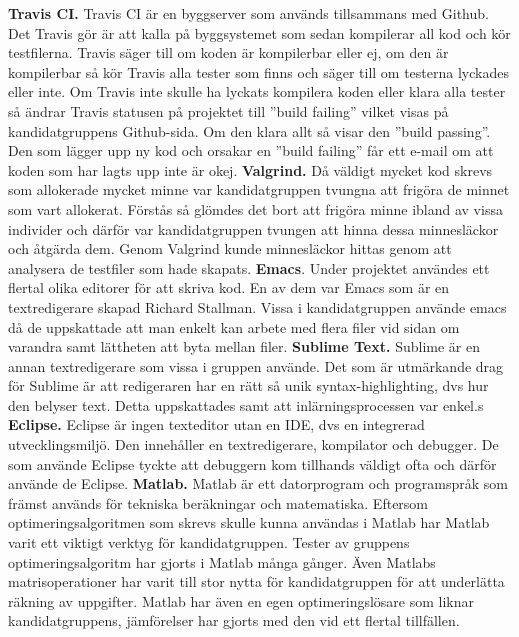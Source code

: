 \newline
\newline 
\textbf{Travis CI.} Travis CI är en byggserver som används tillsammans med Github. Det Travis gör är att kalla på byggsystemet som sedan kompilerar all kod och kör testfilerna. Travis säger till om koden är kompilerbar eller ej, om den är kompilerbar så kör Travis alla tester som finns och säger till om testerna lyckades eller inte. Om Travis inte skulle ha lyckats kompilera koden eller klara alla tester så ändrar Travis statusen på projektet till ''build failing'' vilket visas på kandidatgruppens Github-sida. Om den klara allt så visar den ''build passing''. Den som lägger upp ny kod och orsakar en ''build failing'' får ett e-mail om att koden som har lagts upp inte är okej.
\newline
\newline
\textbf{Valgrind.} Då väldigt mycket kod skrevs som allokerade mycket minne var kandidatgruppen tvungna att frigöra de minnet som vart allokerat. Förstås så glömdes det bort att frigöra minne ibland av vissa individer och därför var kandidatgruppen tvungen att hinna dessa minnesläckor och åtgärda dem. Genom Valgrind kunde minnesläckor hittas genom att analysera de testfiler som hade skapats. 
\newline
\newline
\textbf{Emacs}. Under projektet användes ett flertal olika editorer för att skriva kod. En av dem var Emacs som är en textredigerare skapad Richard 	Stallman. Vissa i kandidatgruppen använde emacs då de uppskattade att man enkelt kan arbete med flera filer vid sidan om varandra samt lättheten att byta mellan filer.
\newline
\newline
\textbf{Sublime Text.} Sublime är en annan textredigerare som vissa i gruppen använde. Det som är utmärkande drag för Sublime är att redigeraren har en rätt så unik syntax-highlighting, dvs hur den belyser text. Detta uppskattades samt att inlärningsprocessen var enkel.s
\newline
\newline
\textbf{Eclipse.} Eclipse är ingen texteditor utan en IDE, dvs en integrerad utvecklingsmiljö. Den innehåller en textredigerare, kompilator och debugger. De som använde Eclipse tyckte att debuggern kom tillhands väldigt ofta och därför använde de Eclipse.
\newline
\newline
\textbf{Matlab.} Matlab är ett datorprogram och programspråk som främst används för tekniska beräkningar och matematiska. Eftersom optimeringsalgoritmen som skrevs skulle kunna användas i Matlab har Matlab varit ett viktigt verktyg för kandidatgruppen. Tester av gruppens optimeringsalgoritm har gjorts i Matlab många gånger. Även Matlabs matrisoperationer har varit till stor nytta för kandidatgruppen för att underlätta räkning av uppgifter. Matlab har även en egen optimeringslösare som liknar kandidatgruppens, jämförelser har gjorts med den vid ett flertal tillfällen.

